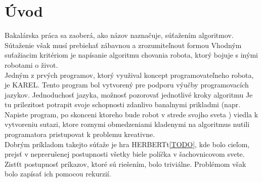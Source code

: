 \chapter{Úvod}
Bakalárska práca sa zaoberá, ako názov naznačuje, súťažením algoritmov. Sútaženie však musí prebiehať zábavnou a zrozumiteľnout formou 
 Vhodným suťažiacim kritériom je napísanie algoritmu chovania robota, ktorý  bojuje s inými robotami o život. \\ %
Jedným z prvých programov, ktorý využival koncept programovateľneho robota, je KAREL. Tento program bol vytvorený pre podporu výučby programovacích jazykov. Jednoduchosť jazyka, možnosť pozorovať jednotlivé kroky algoritmu Je tu prilezitost potrapit svoje schopnosti zdanlivo banalnymi prikladmi (napr. Napiste program, po skonceni ktoreho bude robot v strede svojho sveta ) viedla k vytvoreniu sutazi, ktore roznymi obmedzeniami  kladenymi na algoritmus nutili programatora pristupovat k problemu kreativne. \\
Dobrým príkladom takejto súťaže je hra HERBERTt\ref{TODO}, kde bolo cieľom, prejsť v neprerušenej postupnosti všetky biele políčka v šachovnicovom svete. Zistťt postupnosť príkazov, ktoré sú riešením, bolo triviálne. Problémom však bolo zapísať ich pomocou rekurzií.
